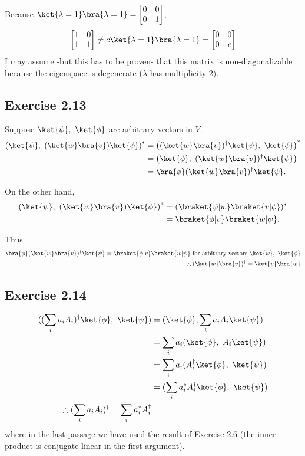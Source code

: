 \documentclass[a4paper,12pt]{article}
\begin{document}
Because $\ket{\lambda = 1}\bra{\lambda = 1} = \begin{bmatrix}
0 & 0 \\
0 & 1
\end{bmatrix}$,
\begin{align*}
	\begin{bmatrix}
	1 & 0 \\
	1 & 1
	\end{bmatrix} \neq c\ket{\lambda = 1}\bra{\lambda = 1} = \begin{bmatrix}
	0 & 0 \\
	0 & c
	\end{bmatrix}
\end{align*}
I may assume -but this has to be proven- that this matrix is non-diagonalizable because the eigenspace is degenerate ($\lambda$ has multiplicity 2).


\subsection*{Exercise 2.13}
Suppose $\ket{\psi},\ \ket{\phi}$ are arbitrary vectors in $V$.
\begin{align*}
	\left(\ket{\psi},\ (\ket{w}\bra{v}) \ket{\phi}\right)^* &=
	\left((\ket{w}\bra{v})^\dagger \ket{\psi},\  \ket{\phi}\right)^*\\
	&= \left(\ket{\phi},\ (\ket{w}\bra{v})^\dagger \ket{\psi} \right)\\
	&= \bra{\phi} (\ket{w}\bra{v})^\dagger \ket{\psi}.
\end{align*}

On the other hand,
\begin{align*}
	\left(\ket{\psi},\ (\ket{w}\bra{v}) \ket{\phi}\right)^*
	&= (\braket{\psi | w} \braket{v | \phi})^*\\
	&= \braket{\phi | v} \braket{w | \psi}.
\end{align*}

Thus
\begin{align*}
	\bra{\phi} (\ket{w}\bra{v})^\dagger \ket{\psi} = \braket{\phi | v} \braket{w | \psi} \text{ for arbitrary vectors } \ket{\psi},\ \ket{\phi}\\
	\therefore (\ket{w}\bra{v})^\dagger = \ket{v}\bra{w}
\end{align*}


\subsection*{Exercise 2.14}
\begin{align*}
	( (\sum_i a_i A_i)^\dagger \ket{\phi},\ \ket{\psi} )
	&= (\ket{\phi},\sum_i a_i A_i \ket{\psi})\\
	&= \sum_i a_i (\ket{\phi},\ A_i \ket{\psi})\\
	&= \sum_i a_i (A_i^\dagger \ket{\phi},\ \ket{\psi})\\
	&= (\sum_i a_i^* A_i^\dagger \ket{\phi},\ \ket{\psi})\\
%
	\therefore (\sum_i a_i A_i)^\dagger = \sum_i a_i^* A_i^\dagger
\end{align*}
where in the last passage we have used the result of Exercise 2.6 (the inner product is conjugate-linear in the first argument).
\end{document}
